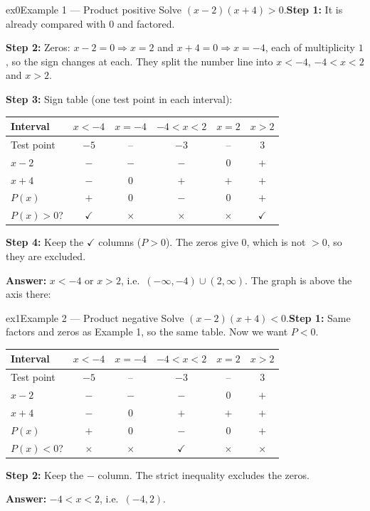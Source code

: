 \documentclass[11pt]{article}
\begin{document}
\begin{example}{ex0}{Example 1 --- Product positive}
Solve $(x-2)(x+4)>0$.\soln \textbf{Step 1:} It is already compared with $0$ and factored.

\textbf{Step 2:} Zeros: $x-2=0\Rightarrow x=2$ and $x+4=0\Rightarrow x=-4$, each of multiplicity $1$, so the sign changes at each. They split the number line into $x<-4$, $-4<x<2$ and $x>2$.

\textbf{Step 3:} Sign table (one test point in each interval):\begin{center}\small\setlength{\tabcolsep}{4pt}\renewcommand{\arraystretch}{1.2}
\begin{tabular}{l|ccccc}
\hline
Interval & $x<-4$ & $x=-4$ & $-4<x<2$ & $x=2$ & $x>2$ \\ \hline
Test point & $-5$ & -- & $-3$ & -- & $3$ \\ \hline
$x-2$ & $-$ & $-$ & $-$ & $0$ & $+$ \\
$x+4$ & $-$ & $0$ & $+$ & $+$ & $+$ \\
\hline
$P(x)$ & $+$ & $0$ & $-$ & $0$ & $+$ \\ \hline
$P(x)>0$? & $\checkmark$ & $\times$ & $\times$ & $\times$ & $\checkmark$ \\ \hline
\end{tabular}\end{center}\textbf{Step 4:} Keep the $\checkmark$ columns ($P>0$). The zeros give $0$, which is not $>0$, so they are excluded.

\textbf{Answer:} $x<-4\text{ or }x>2$, i.e.\ $(-\infty,-4)\cup(2,\infty)$. The graph is above the axis there:
\end{example}

\begin{example}{ex1}{Example 2 --- Product negative}
Solve $(x-2)(x+4)<0$.\soln \textbf{Step 1:} Same factors and zeros as Example 1, so the same table. Now we want $P<0$.\begin{center}\small\setlength{\tabcolsep}{4pt}\renewcommand{\arraystretch}{1.2}
\begin{tabular}{l|ccccc}
\hline
Interval & $x<-4$ & $x=-4$ & $-4<x<2$ & $x=2$ & $x>2$ \\ \hline
Test point & $-5$ & -- & $-3$ & -- & $3$ \\ \hline
$x-2$ & $-$ & $-$ & $-$ & $0$ & $+$ \\
$x+4$ & $-$ & $0$ & $+$ & $+$ & $+$ \\
\hline
$P(x)$ & $+$ & $0$ & $-$ & $0$ & $+$ \\ \hline
$P(x)<0$? & $\times$ & $\times$ & $\checkmark$ & $\times$ & $\times$ \\ \hline
\end{tabular}\end{center}\textbf{Step 2:} Keep the $-$ column. The strict inequality excludes the zeros.

\textbf{Answer:} $-4<x<2$, i.e.\ $(-4,2)$.
\end{example}
\end{document}
